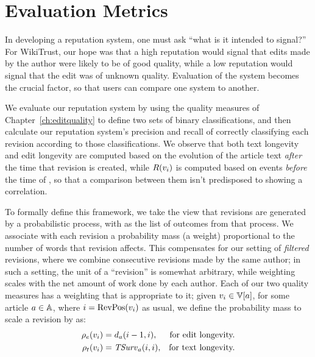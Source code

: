 \section{Evaluation Metrics}
\label{sec:rep-eval}

In developing a reputation system, one must ask
``what is it intended to signal?''
For WikiTrust, our hope was that a high reputation
would signal that edits made by the author were likely
to be of good quality, while a low reputation would
signal that the edit was of unknown quality.
Evaluation of the system becomes the crucial
factor, so that users can compare one system to another.

We evaluate our reputation system by using the quality
measures of Chapter~\ref{ch:editquality} to define two
sets of binary classifications, and then calculate
our reputation system's precision and recall of correctly
classifying each revision according to those classifications.
We observe that both text longevity and edit longevity
are computed based on the
evolution of the article text \textit{after} the time that
revision  is created, while $R(v_{i})$ is
computed based on events \textit{before} the time of ,
so that a comparison between them isn't predisposed to showing
a correlation.

To formally define this framework, we take the view that revisions
are generated by a probabilistic process, with \versions{} as
the list of outcomes from that process.
We associate with each revision a probability mass (a weight)
proportional to the number of words that revision affects.
This compensates for our setting of \textit{filtered} revisions,
where we combine consecutive revisions made by the same author;
in such a setting, the unit of a ``revision'' is somewhat arbitrary,
while weighting scales with the net amount of work done by each author.
Each of our two quality measures has a weighting that is appropriate
to it; given $\version{i} \in \versions{a}$, for some
article $a \in \mathbb{A}$, where $i = \mathrm{RevPos}(v_{i})$ as usual,
we define the probability mass to scale a revision by as:
\begin{align*}
\rho_e(v_{i}) & = d_{a}(i-1,i), & \text{for edit longevity.} \\
\rho_t(v_{i}) & = \mathit{TSurv}_{a}(i,i), & \text{for text longevity.} \\
\end{align*}

